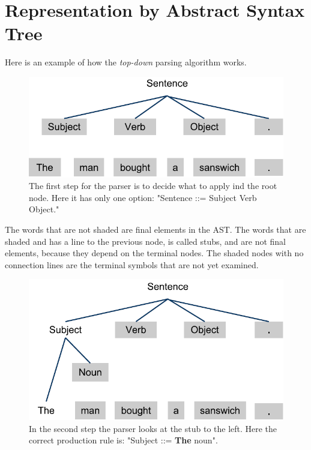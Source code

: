 \section{Representation by Abstract Syntax Tree}
\label{sec:asttheory}
Here is an example of how the \textit{top-down} parsing algorithm works.

\begin{figure}[H]
\begin{center}
\includegraphics[scale=0.5]{Images/parsingexample/AST1.png}
\end{center}
\caption{The first step for the parser is to decide what to apply ind the root node. Here it has only one option: "Sentence ::= Subject Verb Object."}
\end{figure}

The words that are not shaded are final elements in the AST. The words that are shaded and has a line to the previous node, is called stubs, and are not final elements, because they depend on the terminal nodes. The shaded nodes with no connection lines are the terminal symbols that are not yet examined.

\begin{figure}[H]
\begin{center}
\includegraphics[scale=0.5]{Images/parsingexample/AST2.png}
\end{center}
\caption{In the second step the parser looks at the stub to the left. Here the correct production rule is: "Subject ::= \textbf{The} noun".}
\label{fig:ast2}
\end{figure}

